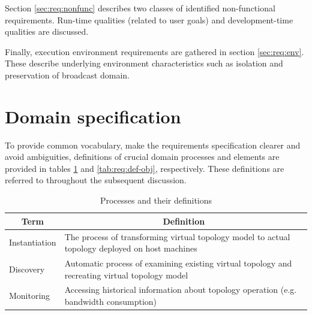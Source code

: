\documentclass[11pt,openany]{book}
\begin{document}
    Section \ref{sec:req:nonfunc} describes two classes of identified non-functional requirements. Run-time qualities
    (related to user goals) and development-time qualities are discussed.

    Finally, execution environment requirements are gathered in section \ref{sec:req:env}. These describe underlying
    environment characteristics such as isolation and preservation of broadcast domain.


    \section{Domain specification}
    \label{sec:req:spec}

      To provide common vocabulary, make the requirements specification clearer and avoid ambiguities, definitions of
      crucial domain processes and elements are provided in tables \ref{tab:req:def-proc} and \ref{tab:req:def-obj},
      respectively. These definitions are referred to throughout the subsequent discussion.

      \begin{table}[H]
        \centering

        \begin{tabularx}{\textwidth}{|l|X|}
          \hline
          \multicolumn{1}{|c|}{Term} & \multicolumn{1}{c|}{Definition}                                            \\
          \hline \hline
          Instantiation              & The process of transforming virtual topology model to actual topology
                                       deployed on host machines                                                  \\
          \hline
          Discovery                  & Automatic process of examining existing virtual topology and recreating
                                       virtual topology model                                                     \\
          \hline
          Monitoring                 & Accessing historical information about topology operation (e.g. bandwidth
                                       consumption)                                                               \\
          \hline
        \end{tabularx}
        
        \caption{Processes and their definitions}
        \label{tab:req:def-proc}
      \end{table}
\end{document}
